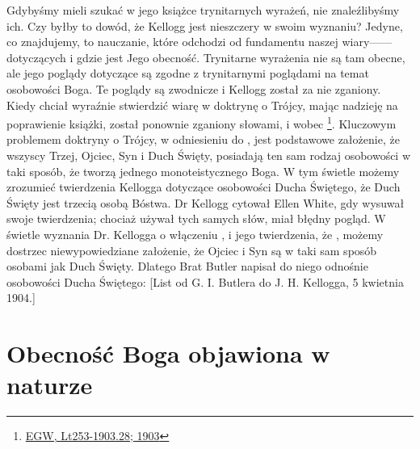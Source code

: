 Gdybyśmy mieli szukać w jego książce trynitarnych wyrażeń, nie znaleźlibyśmy ich. Czy byłby to dowód, że Kellogg jest nieszczery w swoim wyznaniu? Jedyne, co znajdujemy, to nauczanie, które odchodzi od fundamentu naszej wiary——dotyczących  i gdzie jest Jego obecność. Trynitarne wyrażenia nie są tam obecne, ale jego poglądy dotyczące  są zgodne z trynitarnymi poglądami na temat osobowości Boga. Te poglądy są zwodnicze i Kellogg został za nie zganiony. Kiedy chciał wyraźnie stwierdzić wiarę w doktrynę o Trójcy, mając nadzieję na poprawienie książki, został ponownie zganiony słowami,  i wobec \footnote{\href{https://egwwritings.org/?ref=en_Lt253-1903.28&para=9980.36}{EGW, Lt253-1903.28; 1903}}. Kluczowym problemem doktryny o Trójcy, w odniesieniu do , jest podstawowe założenie, że wszyscy Trzej, Ojciec, Syn i Duch Święty, posiadają ten sam rodzaj osobowości w taki sposób, że tworzą jednego monoteistycznego Boga. W tym świetle możemy zrozumieć twierdzenia Kellogga dotyczące osobowości Ducha Świętego, że Duch Święty jest trzecią osobą Bóstwa. Dr Kellogg cytował Ellen White, gdy wysuwał swoje twierdzenia; chociaż używał tych samych słów, miał błędny pogląd. W świetle wyznania Dr. Kellogga o włączeniu , i jego twierdzenia, że , możemy dostrzec niewypowiedziane założenie, że Ojciec i Syn są w taki sam sposób osobami jak Duch Święty. Dlatego Brat Butler napisał do niego odnośnie osobowości Ducha Świętego: [List od G. I. Butlera do J. H. Kellogga, 5 kwietnia 1904.]

\section*{Obecność Boga objawiona w naturze}

